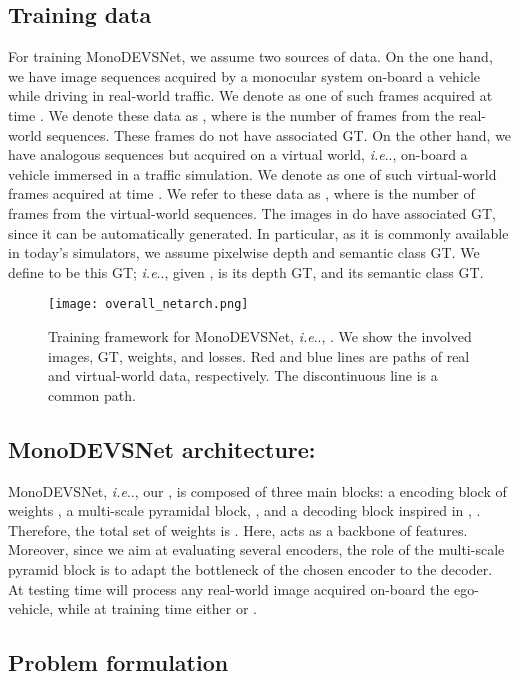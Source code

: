 \documentclass[journal]{IEEEtran}
\makeatletter
\DeclareRobustCommand\onedot{\futurelet\@let@token\@onedot}
\def\@onedot{\ifx\@let@token.\else.\null\fi\xspace}
\def\ie{\emph{i.e}\onedot} \def\Ie{\emph{I.e}\onedot}
\makeatother
\begin{document}
\subsection{Training data}
\label{ssec:trainingdata}
For training MonoDEVSNet, we assume two sources of  data. On the one hand, we have image sequences acquired by a monocular system on-board a vehicle while driving in real-world traffic. We denote as  one of such frames acquired at time . We denote these data as , where  is the number of frames from the real-world sequences. These frames do not have associated GT. On the other hand, we have analogous sequences but acquired on a virtual world, {\ie}, on-board a vehicle immersed in a traffic simulation. We denote as  one of such virtual-world frames acquired at time . We refer to these data as , where  is the number of frames from the virtual-world sequences. The images in  do have associated GT, since it can be automatically generated. In particular, as it is commonly available in today's simulators, we assume pixelwise depth and semantic class GT. We define  to be this GT; {\ie}, given ,  is its depth GT, and  its semantic class GT. 

\begin{figure}
    \centering
    \texttt{[image: overall\_netarch.png]}
    \caption{Training framework for MonoDEVSNet, {\ie}, . We show the involved images, GT, weights, and losses. Red and blue lines are paths of real and virtual-world data, respectively. The discontinuous line is a common path. 
}
    \label{fig:overall_training}
\end{figure}

 
\subsection{MonoDEVSNet architecture: }
\label{ssec:MDECNN}

MonoDEVSNet, {\ie}, our , is composed of three main blocks: a encoding block of weights , a multi-scale pyramidal block, , and a decoding block inspired in \cite{Godard:2019MonoDepth2}, . Therefore, the total set of weights is . Here,  acts as a backbone of features. Moreover, since we aim at evaluating several encoders, the role of the multi-scale pyramid block is to adapt the bottleneck of the chosen encoder to the decoder. At testing time  will process any real-world image  acquired on-board the ego-vehicle, while at training time either  or .

\subsection{Problem formulation}
\label{ssec:formulation}
\end{document}
